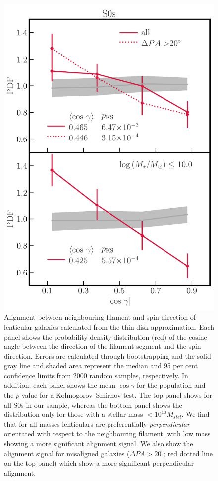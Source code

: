 \begin{figure}
    \centering
    \includegraphics[width=0.65\linewidth]{thesis/latex/cw_spin/spin_fil_S0s_2in1.pdf}
    \caption{Alignment between neighbouring filament and spin direction of lenticular galaxies calculated from the thin disk approximation. Each panel shows the probability density distribution (red) of the cosine angle between the direction of the filament segment and the spin direction. Errors are calculated through bootstrapping and the solid gray line and shaded area represent the median and 95 per cent confidence limits from 2000 random samples, respectively. In addition, each panel shows the mean $\cos \gamma$ for the population and the $p$-value for a Kolmogorov--Smirnov test. The top panel shows for all S0s in our sample, whereas the bottom panel shows the distribution only for those with a stellar mass $< 10^{10} M_{stel}$. We find that for all masses lenticulars are preferentially \textit{perpendicular} orientated with respect to the neighbouring filament, with low mass showing a more significant alignment signal. We also show the alignment signal for misaligned galaxies ($\Delta PA > 20^{\circ}$; red dotted line on the top panel) which show a more significant perpendicular alignment.}
    \label{fig:s0_spin_alignment}
\end{figure}

